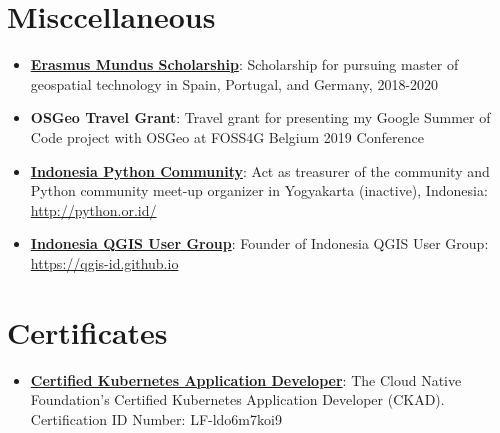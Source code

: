 \documentclass[letterpaper,11pt]{article}
\newcommand{\resumeItem}[2]{
  \item\small{
    \textbf{#1}{: #2 \vspace{-2pt}}
  }
}
\newcommand{\resumeSubItem}[2]{\resumeItem{#1}{#2}\vspace{-4pt}}
\newcommand{\resumeSubHeadingListStart}{\begin{itemize}[leftmargin=*]}
\newcommand{\resumeSubHeadingListEnd}{\end{itemize}}
\begin{document}
\section{Misccellaneous}
  \resumeSubHeadingListStart
    \resumeSubItem{\href{http://mastergeotech.info/}{Erasmus Mundus Scholarship}}
      {Scholarship for pursuing master of geospatial technology in Spain, Portugal, and Germany, 2018-2020}
    \resumeSubItem{OSGeo Travel Grant}
      {Travel grant for presenting my Google Summer of Code project with OSGeo at FOSS4G Belgium 2019 Conference}
    \resumeSubItem{\href{http://python.or.id/}{Indonesia Python Community}}
      {Act as treasurer of the community and Python community meet-up organizer in Yogyakarta (inactive), Indonesia: \url{http://python.or.id/}}
    \resumeSubItem{\href{https://qgis-id.github.io}{Indonesia QGIS User Group}}
      {Founder of Indonesia QGIS User Group: \url{https://qgis-id.github.io}}
  \resumeSubHeadingListEnd

 \section{Certificates}
  \resumeSubHeadingListStart
    \resumeSubItem{\href{http://mastergeotech.info/}{Certified Kubernetes Application Developer}}
      {The Cloud Native Foundation's Certified Kubernetes Application Developer (CKAD). Certification ID Number: LF-ldo6m7koi9}
  \resumeSubHeadingListEnd



\end{document}
